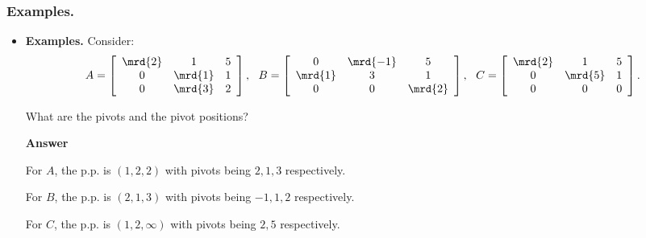 \begin{frame}%
  \frametitle{Examples.}
  \begin{itemize}%
 
\item
{\bf Examples.}
 Consider:
 $$
 A= \left[
 \begin{array}{ccc}
 \mrd{2} & 1 & 5 \\
 0 & \mrd{1} & 1 \\
 0 & \mrd{3} & 2\\
 \end{array}\right],~~
 B= \left[
 \begin{array}{ccc}
 0 & \mrd{-1} & 5 \\
 \mrd{1} & 3 & 1 \\
 0 & 0 & \mrd{2}\\
 \end{array}\right],~~
 C= \left[
 \begin{array}{ccc}
 \mrd{2} & 1 & 5 \\
 0 & \mrd{5} & 1 \\
 0 & 0 & 0\\
 \end{array}\right].
 $$

 What are the pivots and the pivot positions?

 {\bf Answer}
 
 For $A$, the p.p. is $(1,2,2)$ with pivots being $2,1,3$ respectively.

 For $B$, the p.p. is $(2,1,3)$ with pivots being $-1,1,2$ respectively.

 For $C$, the p.p. is $(1,2,\infty)$ with pivots being $2,5$ respectively.
 
\end{itemize}
\end{frame}


